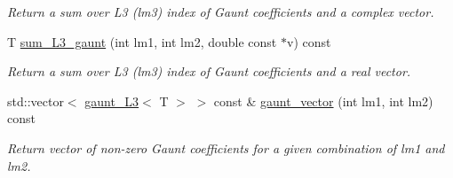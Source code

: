 \begin{DoxyCompactItemize}
\begin{DoxyCompactList}\small\item\em Return a sum over L3 (lm3) index of Gaunt coefficients and a complex vector. \end{DoxyCompactList}\item 
T \hyperlink{classsirius_1_1_gaunt__coefficients_a7035a1d629070884ad2bc0f109b1c4e4}{sum\+\_\+\+L3\+\_\+gaunt} (int lm1, int lm2, double const $\ast$v) const 
\begin{DoxyCompactList}\small\item\em Return a sum over L3 (lm3) index of Gaunt coefficients and a real vector. \end{DoxyCompactList}\item 
std\+::vector$<$ \hyperlink{structsirius_1_1gaunt___l3}{gaunt\+\_\+\+L3}$<$ T $>$ $>$ const \& \hyperlink{classsirius_1_1_gaunt__coefficients_aa4d785ffbe3d04611b34d01ea6738ff9}{gaunt\+\_\+vector} (int lm1, int lm2) const 
\begin{DoxyCompactList}\small\item\em Return vector of non-\/zero Gaunt coefficients for a given combination of lm1 and lm2. \end{DoxyCompactList}\end{DoxyCompactItemize}
